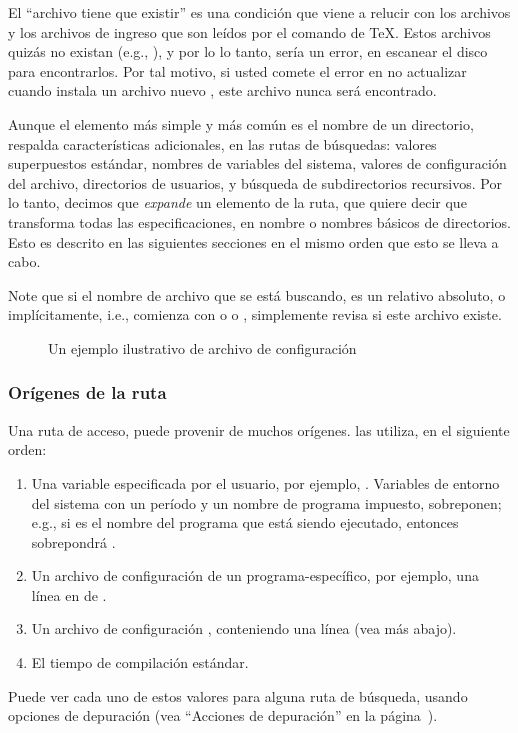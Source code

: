 \documentclass{article}
\begin{document}
El ``archivo tiene que existir'' es una condición que viene a
relucir con los archivos  y los archivos de ingreso
que son leídos por el comando  de \TeX{}. Estos
archivos quizás no existan (e.g., ), y por lo
lo tanto, sería un error, en escanear el disco para
encontrarlos. Por tal motivo, si usted comete el error en no
actualizar  cuando instala un archivo nuevo
, este archivo nunca será encontrado. 

Aunque el elemento más simple y más común es el nombre de un
directorio, \KPS{} respalda características adicionales, en las
rutas de búsquedas: valores superpuestos estándar, nombres de
variables del sistema, valores de configuración del archivo,
directorios de usuarios, y búsqueda de subdirectorios
recursivos. Por lo tanto, decimos que \KPS{} \emph{expande} un
elemento de la ruta, que quiere decir que transforma todas las
especificaciones, en nombre o nombres básicos de directorios.
Esto es descrito en las siguientes secciones en el mismo
orden que esto se lleva a cabo. 

Note que si el nombre de archivo que se está buscando, es un
relativo absoluto, o implícitamente, i.e., comienza con
\samp{/} o  o , \KPS{} simplemente revisa
si este archivo existe. 

\ifSingleColumn
\else
\begin{figure*}

\setlength{\abovecaptionskip}{0pt}
\caption{Un ejemplo ilustrativo de archivo de configuración}
  \label{fig:config-sample}
\end{figure*}
\fi

\subsubsection{Orígenes de la ruta}
\label{sec:path-sources}

Una ruta de acceso, puede provenir de muchos orígenes.
\KPS{} las utiliza, en el siguiente orden:

\begin{enumerate}
	\item
		Una variable especificada por el usuario, por
		ejemplo, \@. Variables de
		entorno del sistema con un período y un nombre
		de programa impuesto, sobreponen; e.g., si
		 es el nombre del programa que
		está siendo ejecutado, entonces
		 sobrepondrá
		.
	\item
		Un archivo de configuración de un
		programa-específico, por ejem\-plo, una línea
		 en  de
		. 
	\item 
		Un archivo de configuración \KPS{}
		, conteniendo una línea
		 (vea más abajo).
	\item
		El tiempo de compilación estándar. 
\end{enumerate}
\noindent Puede ver cada uno de estos valores para alguna ruta
de búsqueda, usando opciones de depuración (vea ``Acciones de
depuración'' en la página~\pageref{sec:debugging}).
\end{document}
